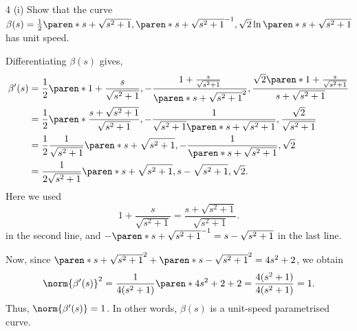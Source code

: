\documentclass[11pt]{penrose}
\begin{document}
\begin{problem}{4 (i)}
    Show that the curve $\beta(s) = \frac{1}{2}\paren*{s + \sqrt{s^2 + 1}, \paren*{s + \sqrt{s^2 + 1}}^{-1}, \sqrt{2}\ln\paren*{s + \sqrt{s^2 + 1}}}$ has unit speed.

    \solution Differentiating $\beta(s)$ gives,
    \begin{align*}
        \beta'(s)
        &= \frac{1}{2}
        \paren*{
            1 + \frac{s}{\sqrt{s^2 + 1}},
            -\frac{1 + \frac{s}{\sqrt{s^2 + 1}}}{\paren*{s + \sqrt{s^2 + 1}}^2},
            \frac{ \sqrt{2} \paren*{1 + \frac{s}{\sqrt{s^2 + 1}}} }{ s + \sqrt{s^2 + 1} }
        }\\
        &= \frac{1}{2}
        \paren*{
            \frac{ s + \sqrt{s^2 + 1} }{ \sqrt{s^2 + 1} },
            -\frac{1}{\sqrt{s^2 + 1} \paren*{s + \sqrt{s^2 + 1}}},
            \frac{ \sqrt{2} }{ \sqrt{s^2 + 1} }
        }\\
        &= \frac{1}{2} \frac{1}{\sqrt{s^2 + 1}}
        \paren*{s + \sqrt{s^2 + 1}, -\frac{1}{\paren*{s + \sqrt{s^2 + 1}}}, \sqrt{2} }\\
        &= \frac{1}{2\sqrt{s^2 + 1}}
        \paren*{s + \sqrt{s^2 + 1}, s - \sqrt{s^2 + 1}, \sqrt{2} }.
    \end{align*}
    Here we used
    \begin{equation*}
        1 + \frac{s}{\sqrt{s^2 + 1}} = \frac{ s + \sqrt{s^2 + 1} }{ \sqrt{s^2 + 1} }.
    \end{equation*}
    in the second line, and $-\paren*{s + \sqrt{s^2 + 1}}^{-1} = s - \sqrt{s^2 + 1}$ in the last line.

    Now, since $\paren*{s + \sqrt{s^2 + 1}}^2 + \paren*{s - \sqrt{s^2 + 1}}^2 = 4s^2 + 2$, we obtain
    \begin{equation*}
        \norm{\beta'(s)}^2
        = \frac{ 1 }{4(s^2 + 1)} \paren*{4s^2 + 2 + 2 }
        = \frac{ 4(s^2 + 1) }{4(s^2 + 1)}
        = 1.
    \end{equation*}
    Thus, $\norm{\beta'(s)} = 1$. In other words, $\beta(s)$ is a unit-speed parametrised curve.
\end{problem}
\end{document}
